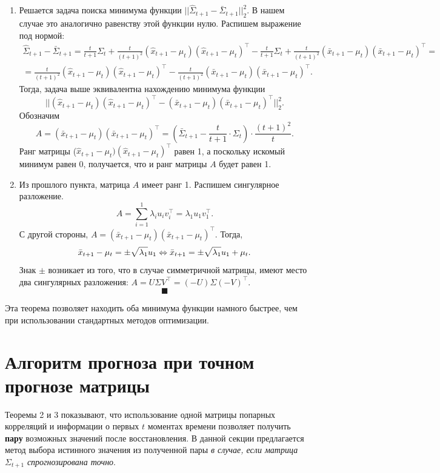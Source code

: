 \documentclass{article}
\begin{document}
\begin{enumerate}
	\item Решается задача поиска минимума функции $||\hat{\Sigma}_{t+1} - \bar{\Sigma}_{t+1}||_2^2$. В нашем случае это аналогично равенству этой функции нулю. Распишем выражение под нормой:
	\begin{gather*}
		\hat{\Sigma}_{t+1} - \bar{\Sigma}_{t+1} = \frac{t}{t+1}\Sigma_t + \frac{t}{(t+1)^2}(\hat{x}_{t+1}-\mu_t)(\hat{x}_{t+1}-\mu_t)^\intercal - \frac{t}{t+1}\Sigma_t + \frac{t}{(t+1)^2}(\bar{x}_{t+1}-\mu_t)(\bar{x}_{t+1}-\mu_t)^\intercal =\\
		=\frac{t}{(t+1)^2}(\hat{x}_{t+1}-\mu_t)(\hat{x}_{t+1}-\mu_t)^\intercal -\frac{t}{(t+1)^2}(\bar{x}_{t+1}-\mu_t)(\bar{x}_{t+1}-\mu_t)^\intercal.
 	\end{gather*}
 	Тогда, задача выше эквивалентна нахождению минимума функции \[||(\hat{x}_{t+1}-\mu_t)(\hat{x}_{t+1}-\mu_t)^\intercal-(\bar{x}_{t+1}-\mu_t)(\bar{x}_{t+1}-\mu_t)^\intercal||_2^2.\]
 	Обозначим \[A = (\bar{x}_{t+1}-\mu_t)(\bar{x}_{t+1}-\mu_t)^\intercal = \left(\bar{\Sigma}_{t+1} - \frac{t}{t+1} \cdot \Sigma_t \right) \cdot \frac{(t+1)^2}{t}.\]
 	Ранг матрицы ($\hat{x}_{t+1}-\mu_t)(\hat{x}_{t+1}-\mu_t)^\intercal$ равен 1, а поскольку искомый минимум равен 0, получается, что и ранг матрицы $A$ будет равен 1.
 	
 	\item Из прошлого пункта, матрица $A$ имеет ранг 1. Распишем сингулярное разложение. \[
 		A = \sum_{i=1}^{1} \lambda_i u_i v_i^\intercal = \lambda_1 u_1 v_1^\intercal.
 	\]
 	С другой стороны, $A = (\bar{x}_{t+1}-\mu_t)(\bar{x}_{t+1}-\mu_t)^\intercal$. Тогда, \[
 	\bar{x}_{t+1}-\mu_t = \pm\sqrt{\lambda_1} u_1 \Leftrightarrow\\
 	\bar{x}_{t+1} = \pm\sqrt{\lambda_1} u_1 + \mu_t.
 	\]
 	Знак $\pm$ возникает из того, что в случае симметричной матрицы, имеют место два сингулярных разложения: $A=U\Sigma V^\intercal=(-U)\Sigma (-V)^\intercal$.
 	$$ \blacksquare $$
\end{enumerate}

Эта теорема позволяет находить оба минимума функции намного быстрее, чем при использовании стандартных методов оптимизации.

\section{Алгоритм прогноза при точном прогнозе матрицы}

Теоремы 2 и 3 показывают, что использование одной матрицы попарных корреляций и информации о первых $t$ моментах времени позволяет получить \textbf{пару} возможных значений после восстановления. В данной секции предлагается метод выбора истинного значения из полученной пары \textit{в случае, если матрица}  $\Sigma_{t+1}$  \textit{спрогнозирована точно}.
\end{document}
